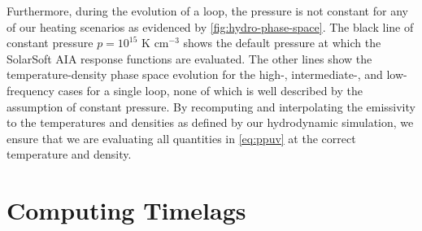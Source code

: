Furthermore, during the evolution of a loop, the pressure is not constant for any of our heating scenarios as evidenced by \autoref{fig:hydro-phase-space}. The black line of constant pressure $p=10^{15}$ K cm$^{-3}$ shows the default pressure at which the SolarSoft AIA response functions are evaluated. The other lines show the temperature-density phase space evolution for the high-, intermediate-, and low-frequency cases for a single loop, none of which is well described by the assumption of constant pressure. By recomputing and interpolating the emissivity to the temperatures and densities as defined by our hydrodynamic simulation, we ensure that we are evaluating all quantities in \autoref{eq:ppuv} at the correct temperature and density.

\section{Computing Timelags}\label{timelag_details}

